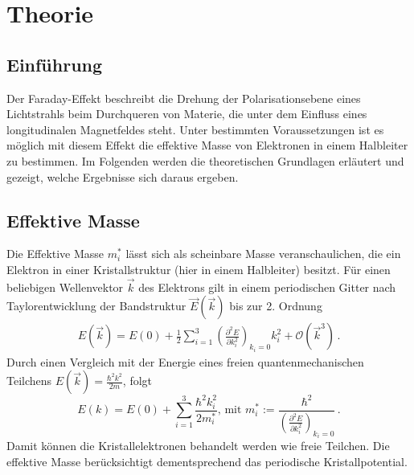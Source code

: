 \section{Theorie}
\label{sec:Theorie}

\subsection{Einführung}
Der Faraday-Effekt beschreibt die Drehung der Polarisationsebene eines Lichtstrahls beim Durchqueren von Materie, die unter dem Einfluss eines longitudinalen Magnetfeldes steht.
Unter bestimmten Voraussetzungen ist es möglich mit diesem Effekt die effektive Masse von Elektronen in einem Halbleiter zu bestimmen.
Im Folgenden werden die theoretischen Grundlagen erläutert und gezeigt, welche Ergebnisse sich daraus ergeben.
\subsection{Effektive Masse}
Die Effektive Masse $m_i^*$ lässt sich als scheinbare Masse veranschaulichen, die ein Elektron in einer Kristallstruktur (hier in einem Halbleiter) besitzt. Für einen beliebigen Wellenvektor $\vec{k}$ des Elektrons gilt in einem periodischen Gitter nach Taylorentwicklung der Bandstruktur $\vec{E}(\vec{k})$ bis zur 2. Ordnung
\begin{align*}
	E(\vec{k})=E(0)+\frac{1}{2}\sum_{i=1}^3\left(\frac{\partial^2 E}{\partial k_i^2}\right)_{k_i=0}k_i^2+\mathcal{O}(\vec{k}^3) \, \mathrm{.}
\end{align*}
Durch einen Vergleich mit der Energie eines freien quantenmechanischen Teilchens $E(\vec{k})=\frac{\hbar^2k^2}{2m}$, folgt
\begin{equation}
	E(k)=E(0)+\sum_{i=1}^3\frac{\hbar^2k_i^2}{2m_i^*}\text{, mit }m_i^*:=\frac{\hbar^2}{\left(\frac{\partial^2 E}{\partial k_i^2}\right)_{k_i=0}} \, \mathrm{.}
\end{equation}
Damit können die Kristallelektronen behandelt werden wie freie Teilchen. Die effektive Masse
berücksichtigt dementsprechend das periodische Kristallpotential.
